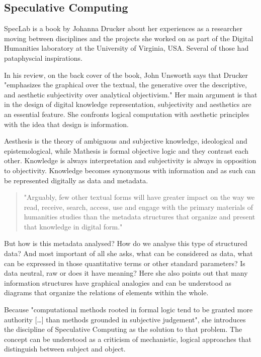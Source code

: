 \subsection{Speculative Computing}

SpecLab \citep{Drucker2009} is a book by Johanna Drucker about her experiences as a researcher moving between disciplines and the projects she worked on as part of the Digital Humanities laboratory at the University of Virginia, USA. Several of those had pataphyscial inspirations.

In his review, on the back cover of the book, John Unsworth says that Drucker "emphasizes the graphical over the textual, the generative over the descriptive, and aesthetic subjectivity over analytical objectivism." Her main argument is that in the design of digital knowledge representation, subjectivity and aesthetics are an essential feature. She confronts logical computation with aesthetic principles with the idea that design is information.

Aesthesis is the theory of ambiguous and subjective knowledge, ideological and epistemological, while Mathesis is formal objective logic and they contrast each other. Knowledge is always interpretation and subjectivity is always in opposition to objectivity. Knowledge becomes synonymous with information and as such can be represented digitally as data and metadata.

\begin{quote}
  "Arguably, few other textual forms will have greater impact on the way we read, receive, search, access, use and engage with the primary materials of humanities studies than the metadata structures that organize and present that knowledge in digital form." \citep[p.9]{Drucker2009}
\end{quote}

But how is this metadata analysed? How do we analyse this type of structured data? And most important of all she asks, what can be considered as data, what can be expressed in those quantitative terms or other standard parameters? Is data neutral, raw or does it have meaning? Here she also points out that many information structures have graphical analogies and can be understood as diagrams that organize the relations of elements within the whole.

Because "computational methods rooted in formal logic tend to be granted more authority […] than methods grounded in subjective judgement", she introduces the discipline of Speculative Computing as the solution to that problem.  The concept can be understood as a criticism of mechanistic, logical approaches that distinguish between subject and object.

